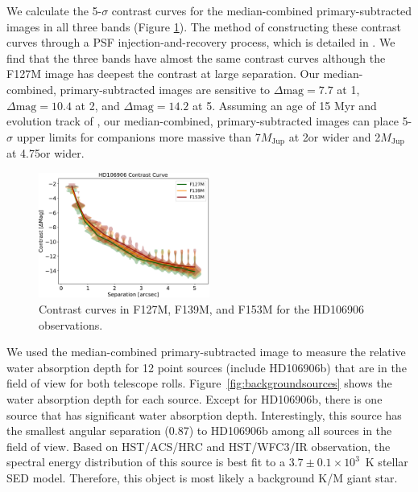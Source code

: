 \documentclass[twocolumn]{aastex62}
\newcommand{\mjup}{\ensuremath{M_\mathrm{Jup}}\xspace}
\begin{document}
We calculate the 5-$\sigma$ contrast curves for the median-combined primary-subtracted images in all three bands (Figure \ref{fig:contrast_curve}). The method of constructing these contrast curves through a PSF injection-and-recovery process, which is detailed in  \citet{Zhou2019}.  We find that the three bands  have almost the same contrast curves although the F127M image has deepest the contrast at large separation.  Our median-combined, primary-subtracted images are sensitive to $\Delta \mbox{mag}=7.7$ at 1\arcsec, $\Delta \mbox{mag}=10.4$ at 2\arcsec, and $\Delta \mbox{mag}=14.2$ at 5\arcsec. Assuming an age of 15 Myr and evolution track of \citet{Saumon2008}, our median-combined, primary-subtracted images can place 5-$\sigma$ upper limits for companions more massive than 7\mjup at 2\arcsec or wider and 2\mjup at 4.75\arcsec or wider.

\begin{figure}
  \centering
  \includegraphics[width=0.5\textwidth]{figures/contrast_curve.pdf}
  \caption{Contrast curves in F127M, F139M, and F153M for the HD106906 observations.}
  \label{fig:contrast_curve}
\end{figure}

We used the median-combined primary-subtracted image to measure the relative water absorption depth for 12 point sources (include HD106906b) that are in the field of view for both telescope rolls. Figure~\ref{fig:backgroundsources} shows the water absorption depth for each source. Except for HD106906b, there is one source that has significant water absorption depth. Interestingly, this source  has the smallest angular separation (0.87\arcsec) to HD106906b among all sources in the field of view.  Based on HST/ACS/HRC and HST/WFC3/IR observation, the spectral energy distribution of this source is best fit to a $3.7\pm0.1\times10^{3}$~K stellar SED model. Therefore, this object is most likely a background K/M giant star.
\end{document}
